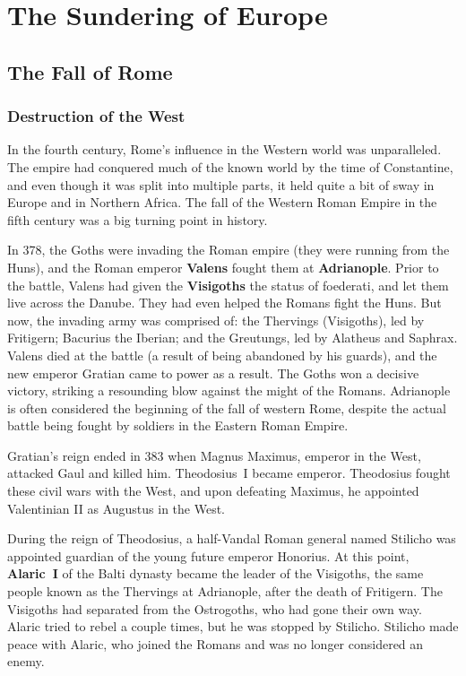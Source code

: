 \chapter{The Sundering of Europe}

\section{The Fall of Rome}

\subsection*{Destruction of the West}

In the fourth century, Rome's influence in the Western world was unparalleled.
The empire had conquered much of the known world by the time of Constantine,
and even though it was split into multiple parts, it held quite a bit of sway
in Europe and in Northern Africa.
The fall of the Western Roman Empire in the fifth century was a big turning point in history.

In 378, the Goths were invading the Roman empire (they were running from the Huns),
and the Roman emperor \textbf{Valens} fought them at \textbf{Adrianople}.
Prior to the battle, Valens had given the \textbf{Visigoths} the status of foederati, and let them live across the Danube.
They had even helped the Romans fight the Huns.
But now, the invading army was comprised of:
the Thervings (Visigoths), led by Fritigern;
Bacurius the Iberian;
and the Greutungs, led by Alatheus and Saphrax.
Valens died at the battle (a result of being abandoned by his guards),
and the new emperor Gratian came to power as a result.
The Goths won a decisive victory, striking a resounding blow against the might of the Romans.
Adrianople is often considered the beginning of the fall of western Rome,
despite the actual battle being fought by soldiers in the Eastern Roman Empire.

Gratian's reign ended in 383 when Magnus Maximus, emperor in the West, attacked Gaul and killed him.
Theodosius~I became emperor.
Theodosius fought these civil wars with the West,
and upon defeating Maximus, he appointed Valentinian II as Augustus in the West.

During the reign of Theodosius, a half-Vandal Roman general named Stilicho
was appointed guardian of the young future emperor Honorius.
At this point, \textbf{Alaric~I} of the Balti dynasty became the leader of the Visigoths,
the same people known as the Thervings at Adrianople, after the death of Fritigern.
The Visigoths had separated from the Ostrogoths, who had gone their own way.
Alaric tried to rebel a couple times, but he was stopped by Stilicho.
Stilicho made peace with Alaric, who joined the Romans and was no longer considered an enemy.

